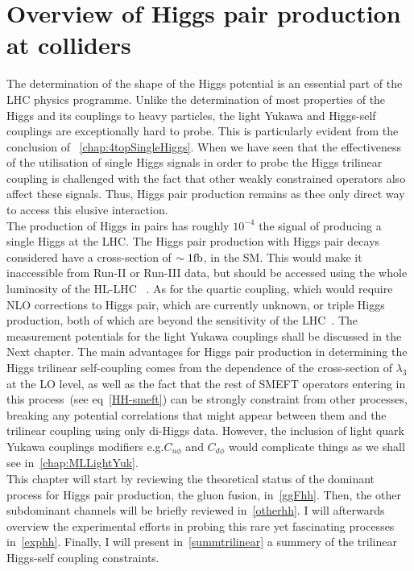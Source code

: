 
\chapter{ Overview of Higgs pair production at colliders }\label{chap:overviewDiHiggs}
The determination of the shape of the Higgs potential is an essential part of the LHC physics programme. Unlike the determination  of most properties of the Higgs and its couplings to heavy particles, the light Yukawa and Higgs-self couplings  are exceptionally hard to probe.  This is particularly evident from the conclusion of ~\autoref{chap:4topSingleHiggs}. When we have seen that the effectiveness of the utilisation of single Higgs signals in order to probe the Higgs trilinear coupling is challenged with the fact that other weakly constrained operators also affect these signals. Thus, Higgs pair production remains as thee only direct way to access this elusive interaction. \\ The production of Higgs in pairs has roughly $ 10^{-4} $ the signal of producing a single Higgs at the LHC. The  Higgs pair production with Higgs pair decays considered have a cross-section of $ \sim 1 \si{\femtobarn}$, in the SM. This would make it inaccessible from Run-II or Run-III data, but should be accessed using the whole luminosity of the HL-LHC ~\cite{Apollinari:2015bam,ATL-PHYS-PUB-2018-053,Cepeda:2019klc}. As for the quartic coupling, which would require NLO corrections to Higgs pair, which are currently unknown, or triple Higgs production, both of which are beyond the sensitivity of the LHC~\cite{Plehn:2005nk}. The measurement potentials for the light Yukawa couplings shall be discussed in the Next chapter.   The main advantages for Higgs pair production in determining the Higgs trilinear self-coupling comes from the dependence of the cross-section of $\lambda_3$ at the LO level, as well as the fact that the rest of SMEFT operators entering in this process~(see eq~\eqref{HH-smeft}) can be strongly constraint from other processes, breaking any potential correlations that might appear between them and the trilinear coupling using only di-Higgs data. However, the inclusion of light quark Yukawa couplings modifiers e.g.$ C_{u\phi}$ and $C_{d \phi}$ would complicate things as we shall see in~\autoref{chap:MLLightYuk}. \\
This chapter will start by reviewing the theoretical status of the dominant process for Higgs pair production, the gluon fusion, in~\autoref{ggFhh}. Then, the other subdominant channels will be briefly reviewed in~\autoref{otherhh}. I will afterwards overview the experimental efforts in probing this rare yet fascinating processes in~\autoref{exphh}. Finally, I will present  in~\autoref{summtrilinear} a summery of the trilinear Higgs-self coupling constraints. 
